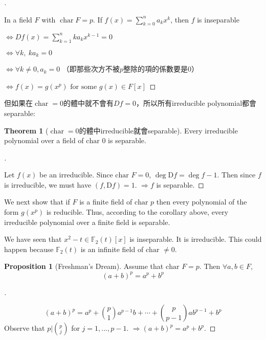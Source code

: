 \documentclass[12pt]{article}
\theoremstyle{definition}
\newtheorem{thm}{Theorem}
\newtheorem{cor}{Corollary}
\newtheorem{prop}{Proposition}
\newenvironment{proofs}[1][\proofname]{%
  \begin{proof}[#1]$ $\par\nobreak\ignorespaces
}{%
  \end{proof}
}
\DeclareMathOperator{\Char}{char}
\begin{document}
\begin{proofs}
	\noindent In a field $F$ with $\Char F=p$. If $f(x)=\sum_{k=0}^n a_k x^k$,
	then $f$ is inseparable

	$\iff Df(x)=\sum_{k=1}^n ka_k x^{k-1}=0$

	$\iff \forall k,\ ka_k=0$

	$\iff \forall k\neq 0, a_k=0$ （即那些次方不被$p$整除的項的係數要是0）

	$\iff f(x)=g(x^p) \text{ for some } g(x)\in F[x]$
\end{proofs}

\noindent 但如果在$\Char=0$的體中就不會有$Df=0$，所以所有irreducible polynomial都會separable:
\begin{thm}[$\Char=0$的體中irreducible就會separable]\label{char0_irred_sep}
	Every irreducible polynomial over a field of $\text{char } 0$ is separable.
\end{thm}

\begin{proofs}
	Let $f(x)$ be an irreducible.
	Since $\text{char } F = 0$, $\deg \mathrm{D} f = \deg f - 1$.
	Then since $f$ is irreducible, we must have $(f, \mathrm{D} f) = 1$.
	$\Rightarrow f$ is separable.
\end{proofs}

We next show that if $F$ is a finite field of $\text{char } p$ then every polynomial of the form $g(x^p)$ is reducible.
Thus, according to the corollary above, every irreducible polynomial over a finite field is separable.

\begin{ex}
	We have seen that $x^2 - t \in \mathbb{F}_2(t)[x]$ is inseparable.
	It is irreducible.
	This could happen because $\mathbb{F}_2(t)$ is an infinite field of $\text{char } \neq 0$.
\end{ex}

\begin{prop}[Freshman's Dream]
	Assume that $\text{char } F = p$.
	Then $\forall a, b \in F$,
	\[
		(a + b)^p = a^p + b^p
	\]
\end{prop}

\begin{proofs}
	\[
		(a + b)^p = a^p + \binom{p}{1} a^{p - 1} b + \cdots + \binom{p}{p - 1} a b^{p - 1} + b^p
	\]
	Observe that $p | \binom{p}{j}$ for $j = 1, ..., p - 1$.
	$\Rightarrow (a + b)^p = a^p + b^p$.
\end{proofs}

\end{document}
